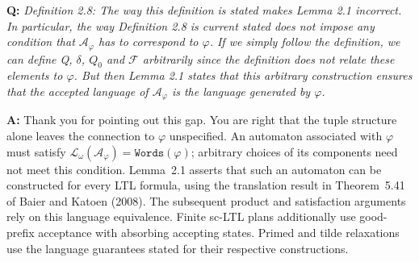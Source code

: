 \documentclass[11pt]{article}
\begin{document}
\begin{shaded*}
\noindent\textbf{Q:} \emph{Definition 2.8: The way this definition is
stated makes Lemma 2.1 incorrect. In particular, the way Definition 2.8 is current stated
does not impose any condition that $\mathcal{A}_{\varphi}$ has to correspond to $\varphi$.
If we simply follow the definition, we can define Q, $\delta$, $Q_0$ and $\mathcal{F}$
arbitrarily since the definition does not relate these elements to $\varphi$. But then
Lemma 2.1 states that this arbitrary construction ensures that the accepted language of
$\mathcal{A}_{\varphi}$ is the language generated by $\varphi$.}
\end{shaded*}
\noindent\textbf{A:} Thank you for pointing out this gap. You are right that the
tuple structure alone leaves the connection to $\varphi$ unspecified. An automaton
associated with $\varphi$ must satisfy
$\mathcal{L}_{\omega}(\mathcal{A}_{\varphi})=\texttt{Words}(\varphi)$;
arbitrary choices of its components need not meet this condition. Lemma~2.1
asserts that such an automaton can be constructed for every LTL formula, using
the translation result in Theorem~5.41 of Baier and Katoen (2008). The subsequent
product and satisfaction arguments rely on this language equivalence. Finite
sc-LTL plans additionally use good-prefix acceptance with absorbing accepting
states. Primed and tilde relaxations use the language guarantees stated for
their respective constructions.
\end{document}
